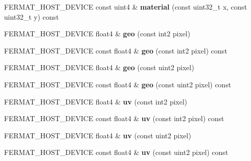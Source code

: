 \begin{DoxyCompactItemize}
\item 
\mbox{\label{struct_g_buffer_view_a4b77f8aedf0a063e4c394c50a750d489}} 
F\+E\+R\+M\+A\+T\+\_\+\+H\+O\+S\+T\+\_\+\+D\+E\+V\+I\+CE const uint4 \& {\bfseries material} (const uint32\+\_\+t x, const uint32\+\_\+t y) const
\item 
\mbox{\label{struct_g_buffer_view_a0aae67169a974124eb177d341ec5338d}} 
F\+E\+R\+M\+A\+T\+\_\+\+H\+O\+S\+T\+\_\+\+D\+E\+V\+I\+CE float4 \& {\bfseries geo} (const int2 pixel)
\item 
\mbox{\label{struct_g_buffer_view_ac08c9ebbf62a11eb5d146949b14d9490}} 
F\+E\+R\+M\+A\+T\+\_\+\+H\+O\+S\+T\+\_\+\+D\+E\+V\+I\+CE const float4 \& {\bfseries geo} (const int2 pixel) const
\item 
\mbox{\label{struct_g_buffer_view_a350149bf2234fb9dd6e40be43b7cf14a}} 
F\+E\+R\+M\+A\+T\+\_\+\+H\+O\+S\+T\+\_\+\+D\+E\+V\+I\+CE float4 \& {\bfseries geo} (const uint2 pixel)
\item 
\mbox{\label{struct_g_buffer_view_aa8fee0482266e3b58b9f788ed8243c56}} 
F\+E\+R\+M\+A\+T\+\_\+\+H\+O\+S\+T\+\_\+\+D\+E\+V\+I\+CE const float4 \& {\bfseries geo} (const uint2 pixel) const
\item 
\mbox{\label{struct_g_buffer_view_ac79f0442651ed01feff7b3a272aaef5e}} 
F\+E\+R\+M\+A\+T\+\_\+\+H\+O\+S\+T\+\_\+\+D\+E\+V\+I\+CE float4 \& {\bfseries uv} (const int2 pixel)
\item 
\mbox{\label{struct_g_buffer_view_a8e889793a5e94a7ed92be50a2932b220}} 
F\+E\+R\+M\+A\+T\+\_\+\+H\+O\+S\+T\+\_\+\+D\+E\+V\+I\+CE const float4 \& {\bfseries uv} (const int2 pixel) const
\item 
\mbox{\label{struct_g_buffer_view_aee9facdd4dbb5ebadadfe72066888a29}} 
F\+E\+R\+M\+A\+T\+\_\+\+H\+O\+S\+T\+\_\+\+D\+E\+V\+I\+CE float4 \& {\bfseries uv} (const uint2 pixel)
\item 
\mbox{\label{struct_g_buffer_view_a1ac669c02aa96a6c8d09b126deed2853}} 
F\+E\+R\+M\+A\+T\+\_\+\+H\+O\+S\+T\+\_\+\+D\+E\+V\+I\+CE const float4 \& {\bfseries uv} (const uint2 pixel) const

\end{DoxyCompactItemize}
